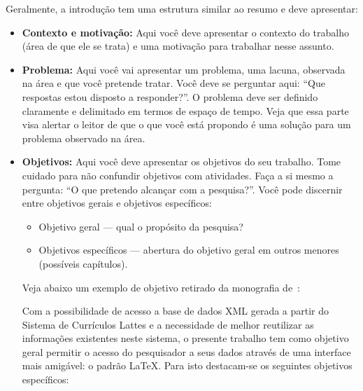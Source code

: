 \documentclass[twoside,english,brazilian]{UNISINOSmonografia}
\begin{document}
Geralmente, a introdução tem uma estrutura similar ao resumo e deve apresentar:
\begin{itemize}
	\item \textbf{Contexto e motivação:} Aqui você deve apresentar o contexto do trabalho (área de que ele se trata) e uma motivação para trabalhar nesse assunto.
	\item \textbf{Problema:} Aqui você vai apresentar um problema, uma lacuna, observada na área e que você pretende tratar. Você deve se perguntar aqui: ``Que respostas estou disposto a responder?''. O problema deve ser definido claramente e delimitado em termos de espaço de tempo. Veja que essa parte visa alertar o leitor de que o que você está propondo é uma solução para um problema observado na área. 
	\item \textbf{Objetivos:} Aqui você deve apresentar os objetivos do seu trabalho. Tome cuidado para não confundir objetivos com atividades.   Faça a si mesmo a pergunta: ``O que pretendo alcançar com a pesquisa?''. Você pode discernir entre objetivos gerais e objetivos específicos:
	\begin{itemize}
		\item Objetivo geral --- qual o propósito da pesquisa?
		\item Objetivos específicos --- abertura do objetivo geral em outros menores (possíveis capítulos).
	\end{itemize}
	Veja abaixo um exemplo de objetivo retirado da monografia de~:

	Com a possibilidade de acesso a base de dados XML gerada a partir do Sistema de Currículos Lattes e a necessidade de melhor reutilizar as informações existentes neste sistema, o presente trabalho tem como objetivo geral permitir o acesso do pesquisador a seus dados através de uma interface mais amigável: o padrão LaTeX. Para isto destacam-se os seguintes objetivos específicos:
\end{itemize}
\end{document}
